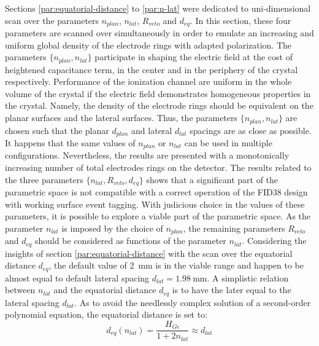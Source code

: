 Sections \ref{par:equatorial-distance} to \ref{par:n-lat} were dedicated to uni-dimensional scan over the parameters $n_{plan}$, $n_{lat}$, $R_{veto}$ and $d_{eq}$. In this section, these four parameters are scanned over simultaneously in order to emulate an increasing and uniform global density of the electrode rings with adapted polarization.
The parameters $\{n_{plan}, n_{lat} \}$ participate in shaping the electric field at the cost of heightened capacitance term, in the center and in the periphery of the crystal respectively. Performance of the ionization channel are uniform in the whole volume of the crystal if the electric field demonstrates homogeneous properties in the crystal. Namely, the density of the electrode rings should be equivalent on the planar surfaces and the lateral surfaces. Thus, the parameters $\{n_{plan}, n_{lat} \}$ are chosen such that the planar $d_{plan}$ and lateral $d_{lat}$ spacings are as close as possible. It happens that the same values of $n_{plan}$ or $n_{lat}$ can be used in multiple configurations. Nevertheless, the results are presented with a monotonically increasing number of total electrodes rings on the detector.
The results related to the three parameters $\{n_{lat}, R_{veto}, d_{eq}\}$ shows that a significant part of the parametric space is not compatible with a correct operation of the FID38 design with working surface event tagging. With judicious choice in the values of these parameters, it is possible to explore a viable part of the parametric space. As the parameter $n_{lat}$ is imposed by the choice of $n_{plan}$, the remaining parameters $R_{veto}$ and $d_{eq}$ should be considered as functions of the parameter $n_{lat}$. Considering the insights of section \ref{par:equatorial-distance} with the scan over the equatorial distance $d_{eq}$, the default value of \SI{2}{\mm} is in the viable range and happen to be almost equal to default lateral spacing $d_{lat} = \SI{1.98}{\mm}$. A simplistic relation between $n_{lat}$ and the equatorial distance $d_{eq}$ is to have the later equal to the lateral spacing $d_{lat}$.
As to avoid the needlessly complex solution of a second-order polynomial equation, the equatorial distance is set to:
\begin{equation}
d_{eq} \left( n_{lat} \right) = \frac{H_{Ge}}{1 + 2 n_{lat}} \approx d_{lat}
\end{equation}
